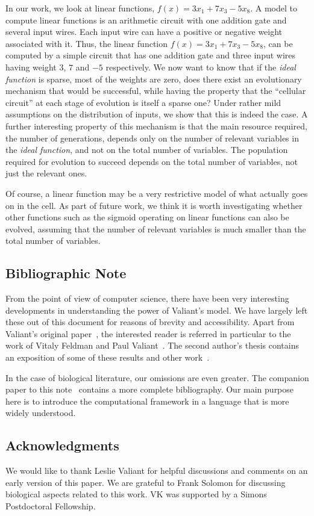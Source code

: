 \documentclass{acmtr2e}
\begin{document}
In our work, we look at linear functions, \eg $f(x) = 3x_1 + 7 x_3 - 5 x_8$.  A
model to compute linear functions is an arithmetic circuit with one addition
gate and several input wires. Each input wire can have a positive or negative
weight associated with it.  Thus, the linear function $f(x) = 3x_1 + 7 x_3
-5x_8$, can be computed by a simple circuit that has one addition gate and three
input wires having weight $3$, $7$ and $-5$ respectively. We now want to know
that if the \emph{ideal function} is sparse, \ie most of the weights are zero,
does there exist an evolutionary mechanism that would be successful, while
having the property that the ``cellular circuit'' at each stage of evolution is
itself a sparse one? Under rather mild assumptions on the distribution of
inputs, we show that this is indeed the case. A further interesting property of
this mechanism is that the main resource required, the number of generations,
depends only on the number of relevant variables in the \emph{ideal function},
and not on the total number of variables. The population required for evolution
to succeed depends on the total number of variables, not just the relevant ones.

Of course, a linear function may be a very restrictive model of what actually
goes on in the cell. As part of future work, we think it is worth investigating
whether other functions such as the sigmoid operating on linear functions can also
be evolved, assuming that the number of relevant variables is much smaller than
the total number of variables.

\subsection*{Bibliographic Note}

From the point of view of computer science, there have been very interesting
developments in understanding the power of Valiant's model. We have largely left
these out of this document for reasons of brevity and accessibility. Apart from
Valiant's original paper~\cite{Valiant:2009-evolvability},
the interested reader is referred in particular to the work of Vitaly Feldman
and Paul Valiant~\cite{Feldman:2008-evolvability,Feldman:2009-robustness,Feldman:2011-LTF,Valiant:2012-real}.
The second author's thesis contains an exposition of some of these results and
other work~\cite{Kanade:2012-thesis}.

In the case of biological literature, our omissions are even greater. The
companion paper to this note~\cite{AK:2013} contains a more complete
bibliography. Our main purpose here is to introduce the computational framework
in a language that is more widely understood.

\subsection*{Acknowledgments} 
We would like to thank Leslie Valiant for helpful discussions and comments on an
early version of this paper. We are grateful to Frank Solomon for discussing
biological aspects related to this work. VK was supported by a Simons
Postdoctoral Fellowship.



\end{document}
